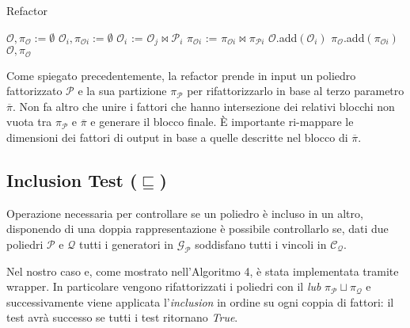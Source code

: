 \documentclass{mimosis}
\theoremstyle{definition}
\begin{document}
\begin{algorithm}[H]
\caption{Refactor}\label{refactor}
\begin{algorithmic}[1]
\State$\mathcal{O}, \pi_{\mathcal{O}} := \emptyset$
 
\State$\mathcal{O}_{i}, \pi_{\mathcal{O}i} := \emptyset$
 
\State$\mathcal{O}_{i}$ := $\mathcal{O}_{j} \bowtie \mathcal{P}_{i}$
\State$\pi_{\mathcal{O}i}$ := $\pi_{\mathcal{O}i} \bowtie \pi_{\mathcal{P}i}$
\EndIf
\EndFor
\State$\mathcal{O}$.add$(\mathcal{O}_{i})$
\State$\pi_{\mathcal{O}}$.add$(\pi_{\mathcal{O}i})$
\EndFor
\State{}
\State\Return$\mathcal{O}, \pi_{\mathcal{O}}$
\EndFunction
\end{algorithmic}
\end{algorithm}

Come spiegato precedentemente, la refactor prende in input un poliedro
fattorizzato \(\mathcal{P}\) e la sua partizione \(\pi_{\mathcal{P}}\) per
rifattorizzarlo in base al terzo parametro \(\overline{\pi}\). Non fa altro che
unire i fattori che hanno intersezione dei relativi blocchi non vuota tra
\(\pi_{\mathcal{P}}\) e \(\overline{\pi}\) e generare il blocco finale. È importante
ri-mappare le dimensioni dei fattori di output in base a quelle descritte nel
blocco di \(\overline{\pi}\).

\subsection{Inclusion Test (\(\sqsubseteq\))}
\label{sec:org5f78bc5}
Operazione necessaria per controllare se un poliedro è incluso in un altro,
disponendo di una doppia rappresentazione è possibile controllarlo se, dati due
poliedri \(\mathcal{P}\) e \(\mathcal{Q}\) tutti i generatori in
\(\mathcal{G}_{\mathcal{P}}\) soddisfano tutti i vincoli in
\(\mathcal{C}_{\mathcal{Q}}\).

Nel nostro caso e, come mostrato nell'Algoritmo 4, è stata implementata tramite
wrapper. In particolare vengono rifattorizzati i poliedri con il \emph{lub}
\(\pi_{\mathcal{P}} \sqcup \pi_{\mathcal{Q}}\) e successivamente viene applicata
l'\emph{inclusion} in ordine su ogni coppia di fattori: il test avrà successo se
tutti i test ritornano \emph{True}.
\end{document}
